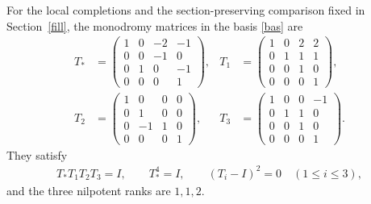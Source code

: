 \begin{proposition}\label{mat}
For the local completions and the section-preserving comparison fixed
in Section~\ref{fill}, the monodromy matrices in the basis
\eqref{bas} are
\begin{align}\label{ms1}
 T_*&=\begin{pmatrix}
 1&0&-2&-1\\0&0&-1&0\\0&1&0&-1\\0&0&0&1
 \end{pmatrix},&
 T_1&=\begin{pmatrix}
 1&0&2&2\\0&1&1&1\\0&0&1&0\\0&0&0&1
 \end{pmatrix},\\
 \label{ms2}
 T_2&=\begin{pmatrix}
 1&0&0&0\\0&1&0&0\\0&-1&1&0\\0&0&0&1
 \end{pmatrix},&
 T_3&=\begin{pmatrix}
 1&0&0&-1\\0&1&1&0\\0&0&1&0\\0&0&0&1
 \end{pmatrix}.
\end{align}
They satisfy
\begin{align}\label{rels}
 T_*T_1T_2T_3=I,\qquad T_*^4=I,\qquad
 (T_i-I)^2=0\quad(1\leq i\leq3),
\end{align}
and the three nilpotent ranks are $1,1,2$.
\end{proposition}
